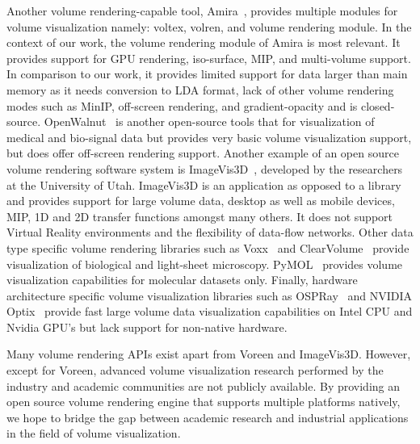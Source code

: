 Another volume rendering-capable tool, Amira~\citep{stalling2005amira}, provides
multiple modules for volume visualization namely: voltex, volren, and volume
rendering module. In the context of our work, the volume rendering module of
Amira is most relevant. It provides support for GPU rendering, iso-surface, MIP,
and multi-volume support. In comparison to our work, it provides limited
support for data larger than main memory as it needs conversion to LDA format,
lack of other volume rendering modes such as MinIP, off-screen rendering,
and gradient-opacity and is closed-source. OpenWalnut~\citep{eichelbaum2010openwalnut}
is another open-source tools that for visualization of medical and bio-signal data but
provides very basic volume visualization support, but does offer off-screen rendering
support. Another example of an open source volume rendering software system is
ImageVis3D~\citep{cibc_imagevis3D:_2016}, developed by the researchers at the
University of Utah. ImageVis3D is an application as opposed to a library and
provides support for large volume data, desktop as well as mobile devices, MIP,
1D and 2D transfer functions amongst many others.  It does not support Virtual
Reality environments and the flexibility of data-flow networks. Other data
type specific volume rendering libraries such as
Voxx~\citep{clendenon_voxx:_2002} and
ClearVolume~\citep{royer_clearvolume:_2015} provide visualization of
biological and light-sheet microscopy.
PyMOL~\citep{schrodinger_llc_pymol_2015} provides volume visualization
capabilities for molecular datasets only. Finally, hardware architecture
specific volume visualization libraries such as
OSPRay~\citep{wald_ospray_2017} and NVIDIA\textsuperscript{\textregistered}
Optix\textsuperscript{\texttrademark}~\citep{parker_optix:_2010} provide fast
large volume data visualization capabilities on Intel CPU and Nvidia GPU's but
lack support for non-native hardware.

Many volume rendering APIs exist apart from Voreen and ImageVis3D. However,
except for Voreen, advanced volume visualization research performed by the
industry and academic communities are not publicly available. By providing an
open source volume rendering engine that supports multiple platforms natively,
we hope to bridge the gap between academic research and industrial applications
in the field of volume visualization.
